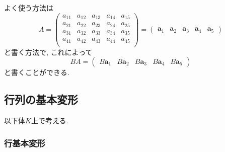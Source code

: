 \documentclass[dvipdfmx,a4paper,11pt]{article} %
\theoremstyle{definition}
\begin{document}
よく使う方法は
$$
A   =
\begin{pmatrix}
a_{11}& a_{12} &a_{13}& a_{14} & a_{15}  \\
a_{21}& a_{22} & a_{23}& a_{24} & a_{25}   \\
a_{31}& a_{32} &a_{33}& a_{34} & a_{35}  \\
a_{41}& a_{42} &a_{43}& a_{44} & a_{45}  \\
\end{pmatrix}
=
    \begin{pmatrix}
    \bm{a}_1&\bm{a}_2&\bm{a}_3&\bm{a}_4&\bm{a}_5
    \end{pmatrix}
$$
と書く方法で, これによって
$$
BA
=
    \begin{pmatrix}
    B\bm{a}_1&B\bm{a}_2&B\bm{a}_3&B\bm{a}_4&B\bm{a}_5
    \end{pmatrix}
$$
と書くことができる. 



\subsection{行列の基本変形 \cite[2.2節]{O}}
以下体$K$上で考える. 


 \subsubsection{行基本変形}
\end{document}
